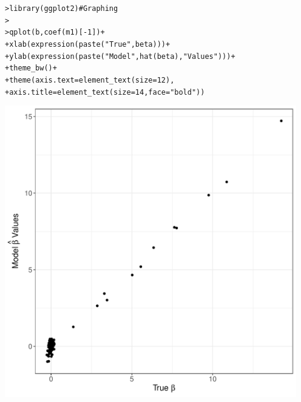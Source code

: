 \documentclass[12pt]{article}\usepackage[]{graphicx}\usepackage[]{color}
\makeatletter
\newcommand{\hlnum}[1]{\textcolor[rgb]{0.82,0.78,0.62}{#1}}%
\newcommand{\hlstr}[1]{\textcolor[rgb]{0.82,0.78,0.62}{#1}}%
\newcommand{\hlcom}[1]{\textcolor[rgb]{0.404,0.408,0.42}{#1}}%
\newcommand{\hlopt}[1]{\textcolor[rgb]{0.882,0.878,0.898}{#1}}%
\newcommand{\hlstd}[1]{\textcolor[rgb]{0.882,0.878,0.898}{#1}}%
\newcommand{\hlkwc}[1]{\textcolor[rgb]{0.812,0.522,0.388}{#1}}%
\newcommand{\hlkwd}[1]{\textcolor[rgb]{0.733,0.388,0.812}{#1}}%
\newenvironment{kframe}{%
 \def\at@end@of@kframe{}%
 \ifinner\ifhmode%
  \def\at@end@of@kframe{\end{minipage}}%
  \begin{minipage}{\columnwidth}%
 \fi\fi%
 \def\FrameCommand##1{\hskip\@totalleftmargin \hskip-\fboxsep
 \colorbox{shadecolor}{##1}\hskip-\fboxsep
     \hskip-\linewidth \hskip-\@totalleftmargin \hskip\columnwidth}%
 \MakeFramed {\advance\hsize-\width
   \@totalleftmargin\z@ \linewidth\hsize
   \@setminipage}}%
 {\par\unskip\endMakeFramed%
 \at@end@of@kframe}
\newenvironment{knitrout}{}{} %
\makeatother
\begin{document}
\begin{flushleft}
\begin{center}
\begin{knitrout}
\color{fgcolor}\begin{kframe}
\begin{alltt}
\hlstd{> }\hlkwd{library}\hlstd{(ggplot2)} \hlcom{# Graphing}
\hlstd{> }
\hlstd{> }\hlkwd{qplot}\hlstd{(b,} \hlkwd{coef}\hlstd{(m1)[}\hlopt{-}\hlnum{1}\hlstd{])}\hlopt{+}
\hlstd{+ }     \hlkwd{xlab}\hlstd{(} \hlkwd{expression}\hlstd{(}\hlkwd{paste}\hlstd{(}\hlstr{"True "} \hlstd{, beta)))}\hlopt{+}
\hlstd{+ }     \hlkwd{ylab}\hlstd{(} \hlkwd{expression}\hlstd{(}\hlkwd{paste}\hlstd{(}\hlstr{"Model "} \hlstd{,} \hlkwd{hat}\hlstd{(beta),} \hlstr{" Values"}\hlstd{)))}\hlopt{+}
\hlstd{+ }     \hlkwd{theme_bw}\hlstd{()}\hlopt{+}
\hlstd{+ }     \hlkwd{theme}\hlstd{(}\hlkwc{axis.text}\hlstd{=}\hlkwd{element_text}\hlstd{(}\hlkwc{size}\hlstd{=}\hlnum{12}\hlstd{),}
\hlstd{+ }           \hlkwc{axis.title}\hlstd{=}\hlkwd{element_text}\hlstd{(}\hlkwc{size}\hlstd{=}\hlnum{14}\hlstd{,}\hlkwc{face}\hlstd{=}\hlstr{"bold"}\hlstd{))}
\end{alltt}
\end{kframe}
\includegraphics[width=5in]{figure/betabetatestPenRegress1-1} 

\end{knitrout}
\end{center}


\end{flushleft}
\end{document}
